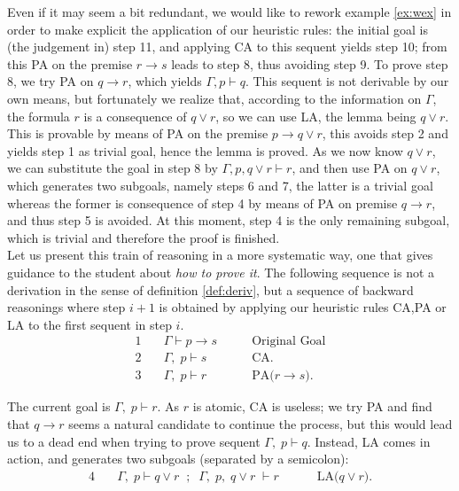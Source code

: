 \documentclass[a4paper,UKenglish]{lipics}
\newcommand{\G}{\Gamma}
\begin{document}
Even if it may seem a bit redundant, we would like to rework example \ref{ex:wex} in order to make explicit the application of our heuristic rules:
the initial goal is (the judgement in) step 11, and applying CA to this sequent yields step 10; from this PA on the premise $r\to s$ leads to step 8, thus avoiding step 9. To prove step 8, we try PA on $q\to r$, which yields $\G,p\vdash q$. This sequent is not derivable by our own means, but fortunately we realize that, according to the information on $\G$, the formula $r$ is a consequence of $q\lor r$, so we can use LA, the lemma being $q\lor r$. This is provable by means of PA on the premise $p\to q\lor r$, this avoids step 2 and yields step 1 as trivial goal, hence the lemma is proved. As we now know $q\lor r$, we can substitute the goal in step 8 by $\G,p,q\lor r\vdash r$, and then use PA on $q\lor r$, which generates two subgoals, namely steps 6 and 7, the latter is a trivial goal whereas the former is consequence of step 4 by means of PA on premise $q\to r$, and thus step 5 is avoided. At this moment, step 4 is the only remaining subgoal, which is trivial and therefore the proof is 
finished. \\


Let us present this train of reasoning in a more systematic way, one that gives guidance to the student about {\em how to prove it}. The following sequence is not a derivation in the sense of definition \ref{def:deriv}, but a sequence of backward reasonings where step $i+1$ is obtained by applying our heuristic rules CA,PA or LA to the first sequent in step $i$.
\[
\begin{array}{rll}
1 \quad & \G \vdash p\to s & \qquad \mbox{Original Goal} \\
2 \quad & \G,\;p \vdash s & \qquad  \mbox{CA.} \\
3 \quad & \G,\;p \vdash r & \qquad  \mbox{PA(}r\to s \mbox{).}
\end{array}
\]

The current goal is $\G,\;p\vdash r$. As $r$ is atomic, CA is useless; we try PA and find that $q \to r$ seems a natural candidate to continue the process, but this would lead us to a dead end when trying to prove sequent $\G,\;p \vdash q$. Instead, LA comes in action, and generates two subgoals (separated by a semicolon):
\[
\begin{array}{rll}
4\quad & \G,\;p \vdash q\lor r \;\; ; \;\; \G,\;p,\;q\lor r\;\vdash r\; & \qquad \mbox{LA(}q\lor r \mbox{).} 
\end{array} \]
\end{document}
